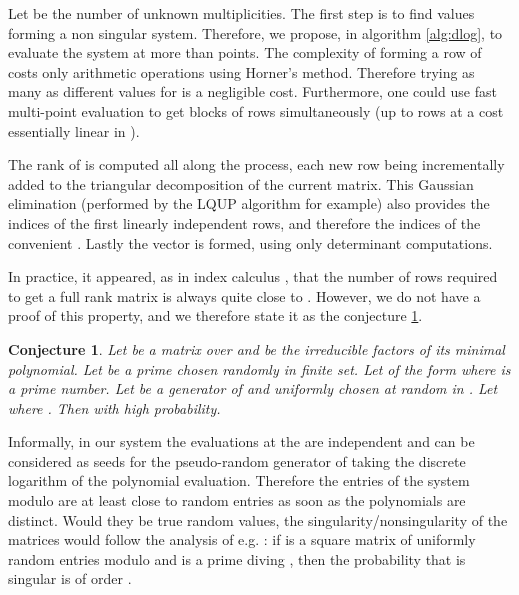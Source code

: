 \documentclass{article}
\newtheorem{conj}[thm]{Conjecture}
\begin{document}
Let  be the number of unknown multiplicities. 
The first step is to find  values  forming a non
singular system. Therefore, we propose, in algorithm \ref{alg:dlog},
to evaluate the system at more than  points. The complexity of
forming a row of  costs only  arithmetic operations
using Horner's method. Therefore trying as many as  different values for  is
a negligible cost. 
Furthermore, one could use fast multi-point evaluation to get
blocks of rows simultaneously (up to  rows at a cost essentially linear in ).

The rank of  is computed all along the process, each new row being
incrementally added to the triangular decomposition of the current matrix.
This Gaussian elimination (performed by the LQUP algorithm
\cite{Ibarra:1982:LSP} for example) 
also provides the indices of the first  linearly independent
rows, and therefore the indices of the convenient .
Lastly the vector  is formed, using only  determinant computations.



In practice, it appeared, as in index calculus
\cite{Bender:1998:rdlog,Hess:2007:dlog}, that the
number of rows
required to get a
full rank matrix  is always quite close to .
However, we do not have a proof of this property, and we therefore 
state it as the conjecture
\ref{conj:dlog}. 
\begin{conj}\label{conj:dlog}
Let  be a  matrix over  and  be the
irreducible factors of its minimal polynomial.
Let  be a prime chosen randomly in finite set. Let  of the
form  where  is a prime number. Let  be a generator of 
  and   uniformly chosen at random in
  .
Let  where . 
Then  with high probability.


\end{conj}



Informally, in our system the
evaluations at the  are independent and can be
considered as seeds for the pseudo-random generator of taking the
discrete logarithm of the polynomial evaluation. 
Therefore the entries of the system modulo  
are at least close to random entries as soon as the polynomials are
distinct.
Would they be true random values,  the singularity/nonsingularity of the matrices
would follow the analysis of e.g. \cite[Corollary
2.4]{Blomer:1997:rank}: 
if  is a square matrix of uniformly random 
entries modulo  and  is a prime  diving , then the
probability that  is singular is of order .
\end{document}
